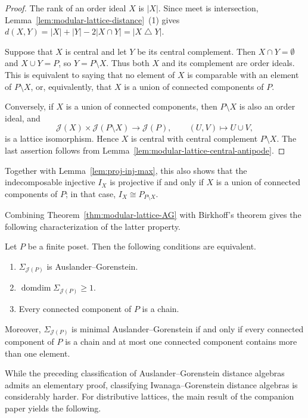 \documentclass[a4paper,leqno]{amsart}
\begin{document}
\begin{proof}
The rank of an order ideal $X$ is $|X|$. Since meet is intersection,
Lemma~\ref{lem:modular-lattice-distance}~(1) gives
$d(X,Y)=|X|+|Y|-2|X\cap Y|=|X\mathbin{\triangle}Y|$.

Suppose that $X$ is central and let $Y$ be its central complement. Then
$X\cap Y=\emptyset$ and $X\cup Y=P$, so $Y=P\setminus X$. Thus both
$X$ and its complement are order ideals. This is equivalent to saying
that no element of $X$ is comparable with an element of $P\setminus X$,
or, equivalently, that $X$ is a union of connected components of $P$.

Conversely, if $X$ is a union of connected components, then
$P\setminus X$ is also an order ideal, and
\[
\mathcal J(X)\times\mathcal J(P\setminus X)
\longrightarrow\mathcal J(P),
\qquad (U,V)\longmapsto U\cup V,
\]
is a lattice isomorphism. Hence $X$ is central with central complement
$P\setminus X$. The last assertion follows from
Lemma~\ref{lem:modular-lattice-central-antipode}.
\end{proof}

Together with Lemma~\ref{lem:proj-inj-max}, this also shows that the
indecomposable injective $I_X$ is projective if and only if $X$ is a
union of connected components of $P$; in that case,
$I_X\cong P_{P\setminus X}$.

Combining Theorem~\ref{thm:modular-lattice-AG} with Birkhoff's theorem gives the following characterization of the latter property.

\begin{cor}\label{cor:distributive-lattice-AG}
Let $P$ be a finite poset. Then the following conditions are equivalent.
\begin{enumerate}
    \item $\Sigma_{\mathcal{J}(P)}$ is Auslander--Gorenstein.
    \item $\operatorname{domdim}\Sigma_{\mathcal{J}(P)}\geq1$.
    \item Every connected component of $P$ is a chain.
\end{enumerate}
Moreover, $\Sigma_{\mathcal J(P)}$ is minimal Auslander--Gorenstein if and only if every connected component of $P$ is a chain and at most one connected component contains more than one element.
\end{cor}

While the preceding classification of Auslander--Gorenstein
distance algebras admits an elementary proof, classifying
Iwanaga--Gorenstein distance algebras is considerably harder.
For distributive lattices, the main result of the companion
paper \cite{CX2026} yields the following.
\end{document}
